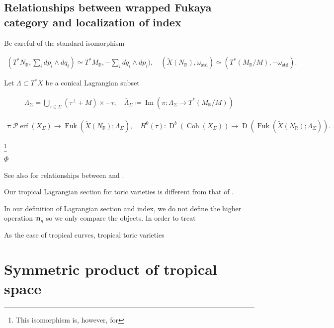 \documentclass[a4paper,dvipdfmx,reqno,12pt]{amsart}
\theoremstyle{definition}
\newcommand{\deq}{\coloneqq}
\newcommand{\R}{\mathbb{R}}%
\newcommand{\mcal}[1]{\mathcal{#1}}%
\newcommand{\mf}[1]{\mathfrak{#1}}%
\newcommand{\opn}[1]{\operatorname{#1}}
\numberwithin{equation}{section}
\begin{document}
\subsection{Relationships between wrapped Fukaya category and localization of index}

Be careful of the standard isomorphism

\begin{align}
  (T^*N_{\R},\sum _idp_i\wedge dq_i)
  \simeq T^{*}M_{\R},-\sum_i dq_i\wedge dp_i),
  \quad (\check{X}(N_{\R}),\omega_{\opn{std}})\simeq (T^{*}(M_{\R}/M),-\omega_{\opn{std}}).
\end{align}

Let $\Lambda \subset T^{*}X$ be a conical Lagrangian subset

\begin{align}
  \Lambda_{\Sigma} =
  \bigcup_{\tau \in \Sigma}(\tau^{\bot} +M)\times -\tau,
  \quad \bar{\Lambda}_{\Sigma}\deq \opn{Im}(\pi:\Lambda_{\Sigma} \to T^{*}(M_{\R}/M))
\end{align}

\cite[Theorem 2, Corollary 2]{MR2871160}

\begin{align}
  \bar{\tau}:\mcal{P}\!\opn{erf}(X_{\Sigma})
  \to \opn{Fuk}(\check{X}(N_{\R});\bar{\Lambda}_{\Sigma}), \quad
  H^{0}(\bar{\tau}): \opn{D}^{b}(\opn{Coh}(X_{\Sigma}))\to
  \opn{D}(\opn{Fuk}(\check{X}(N_{\R});\bar{\Lambda}_{\Sigma})).
\end{align}


\footnote{This isomorphism is, however, for }

$\Phi_{}$

See also \cite[Appendix C.2.]{MR2871160} for relationships
between \cite{MR2871160} and \cite{MR2240909,MR2529936}.

Our tropical Lagrangian section for toric varieties is different from
that of \cite{MR2240909,MR2529936}.

In our definition of Lagrangian section and index, we do not define the higher operation
$\mf{m}_n$ so we only compare the objects.
In order to treat

\cite{MR3173401}
As the case of tropical curves, tropical toric varieties



\section{Symmetric product of tropical space}
\end{document}
